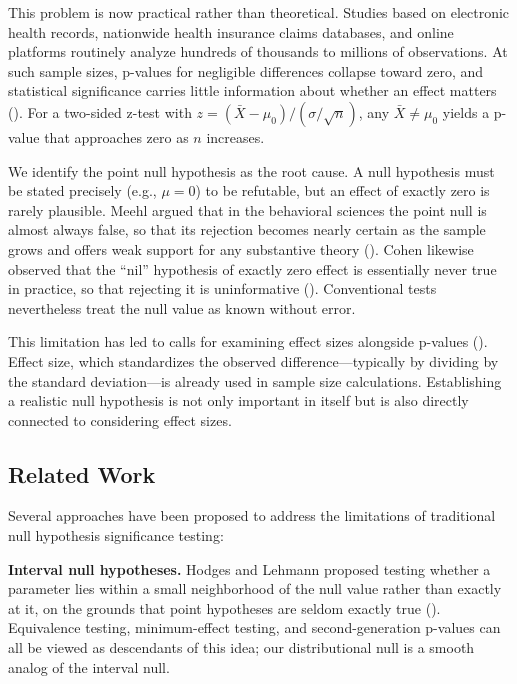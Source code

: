 \documentclass[
  11pt,
  letterpaper,
]{article}
\begin{document}
This problem is now practical rather than theoretical. Studies based on
electronic health records, nationwide health insurance claims databases,
and online platforms routinely analyze hundreds of thousands to millions
of observations. At such sample sizes, p-values for negligible
differences collapse toward zero, and statistical significance carries
little information about whether an effect matters
(). For a two-sided z-test
with \(z = (\bar{X} - \mu_0)/(\sigma/\sqrt{n})\), any
\(\bar{X} \neq \mu_0\) yields a p-value that approaches zero as \(n\)
increases.

We identify the point null hypothesis as the root cause. A null
hypothesis must be stated precisely (e.g., \(\mu = 0\)) to be refutable,
but an effect of exactly zero is rarely plausible. Meehl argued that in
the behavioral sciences the point null is almost always false, so that
its rejection becomes nearly certain as the sample grows and offers weak
support for any substantive theory (). Cohen likewise observed that the ``nil'' hypothesis of exactly
zero effect is essentially never true in practice, so that rejecting it
is uninformative ().
Conventional tests nevertheless treat the null value as known without
error.

This limitation has led to calls for examining effect sizes alongside
p-values ().
Effect size, which standardizes the observed difference---typically by
dividing by the standard deviation---is already used in sample size
calculations. Establishing a realistic null hypothesis is not only
important in itself but is also directly connected to considering effect
sizes.

\subsection{Related Work}\label{related-work}

Several approaches have been proposed to address the limitations of
traditional null hypothesis significance testing:

\textbf{Interval null hypotheses.} Hodges and Lehmann proposed testing
whether a parameter lies within a small neighborhood of the null value
rather than exactly at it, on the grounds that point hypotheses are
seldom exactly true (). Equivalence testing, minimum-effect testing, and
second-generation p-values can all be viewed as descendants of this
idea; our distributional null is a smooth analog of the interval null.
\end{document}
